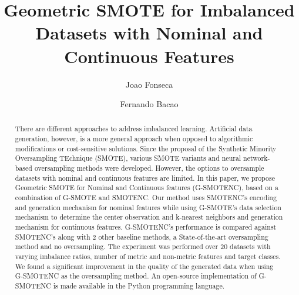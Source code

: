 \documentclass[preprint,12pt]{elsarticle}
\begin{document}
{\setlength{\tabcolsep}{2.5pt}

\begin{frontmatter}

\title{Geometric SMOTE for Imbalanced Datasets with Nominal and Continuous Features}

\author[inst1]{Joao Fonseca}
\author[inst1]{Fernando Bacao}


\begin{abstract}

    There are different approaches to address imbalanced learning. Artificial
    data generation, however, is a more general approach when opposed to
    algorithmic modifications or cost-sensitive solutions. Since the proposal
    of the Synthetic Minority Oversampling TEchnique (SMOTE), various SMOTE
    variants and neural network-based oversampling methods were developed.
    However, the options to oversample datasets with nominal and continuous
    features are limited. In this paper, we propose Geometric SMOTE for
    Nominal and Continuous features (G-SMOTENC), based on a combination of
    G-SMOTE and SMOTENC. Our method uses SMOTENC's encoding and generation
    mechanism for nominal features while using G-SMOTE's data selection
    mechanism to determine the center observation and k-nearest neighbors and
    generation mechanism for continuous features. G-SMOTENC's performance is
    compared against SMOTENC's along with 2 other baseline methods, a
    State-of-the-art oversampling method and no oversampling. The experiment
    was performed over 20 datasets with varying imbalance ratios, number of
    metric and non-metric features and target classes. We found a significant
    improvement in the quality of the generated data when using G-SMOTENC as
    the oversampling method. An open-source implementation of G-SMOTENC is
    made available in the Python programming language.

\end{abstract}



\end{frontmatter}}
\end{document}
